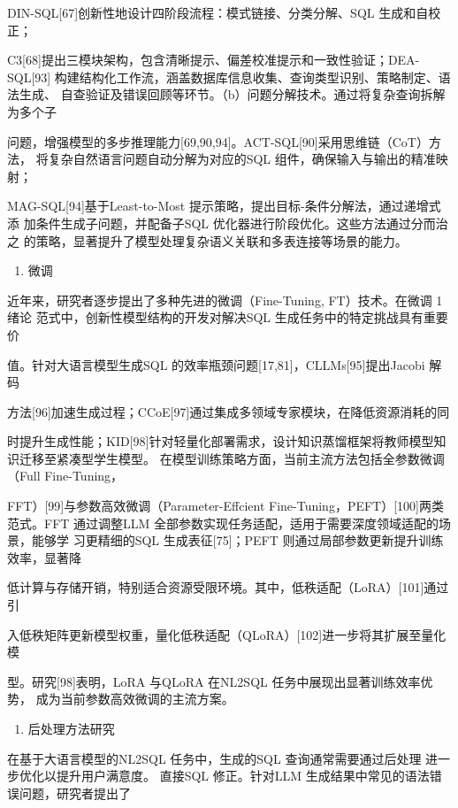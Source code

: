 \documentclass[12pt,a4paper,openright,UTF8]{ctexbook}
\begin{document}
DIN-SQL[67]创新性地设计四阶段流程：模式链接、分类分解、SQL 生成和自校正；

C3[68]提出三模块架构，包含清晰提示、偏差校准提示和一致性验证；DEA-SQL[93] 构建结构化工作流，涵盖数据库信息收集、查询类型识别、策略制定、语法生成、 自查验证及错误回顾等环节。（b）问题分解技术。通过将复杂查询拆解为多个子

问题，增强模型的多步推理能力[69,90,94]。ACT-SQL[90]采用思维链（CoT）方法， 将复杂自然语言问题自动分解为对应的SQL 组件，确保输入与输出的精准映射；

MAG-SQL[94]基于Least-to-Most 提示策略，提出目标-条件分解法，通过递增式添 加条件生成子问题，并配备子SQL 优化器进行阶段优化。这些方法通过分而治之 的策略，显著提升了模型处理复杂语义关联和多表连接等场景的能力。

\begin{enumerate}[label=(\arabic*)]
\item 微调
\end{enumerate}
近年来，研究者逐步提出了多种先进的微调（Fine-Tuning, FT）技术。在微调 1绪论 范式中，创新性模型结构的开发对解决SQL 生成任务中的特定挑战具有重要价

值。针对大语言模型生成SQL 的效率瓶颈问题[17,81]，CLLMs[95]提出Jacobi 解码

方法[96]加速生成过程；CCoE[97]通过集成多领域专家模块，在降低资源消耗的同

时提升生成性能；KID[98]针对轻量化部署需求，设计知识蒸馏框架将教师模型知 识迁移至紧凑型学生模型。 在模型训练策略方面，当前主流方法包括全参数微调（Full Fine-Tuning，

FFT）[99]与参数高效微调（Parameter-Effcient Fine-Tuning，PEFT）[100]两类范式。FFT 通过调整LLM 全部参数实现任务适配，适用于需要深度领域适配的场景，能够学 习更精细的SQL 生成表征[75]；PEFT 则通过局部参数更新提升训练效率，显著降

低计算与存储开销，特别适合资源受限环境。其中，低秩适配（LoRA）[101]通过引

入低秩矩阵更新模型权重，量化低秩适配（QLoRA）[102]进一步将其扩展至量化模

型。研究[98]表明，LoRA 与QLoRA 在NL2SQL 任务中展现出显著训练效率优势， 成为当前参数高效微调的主流方案。

\begin{enumerate}[label=(\arabic*)]
\item 后处理方法研究
\end{enumerate}
在基于大语言模型的NL2SQL 任务中，生成的SQL 查询通常需要通过后处理 进一步优化以提升用户满意度。 直接SQL 修正。针对LLM 生成结果中常见的语法错误问题，研究者提出了
\end{document}
